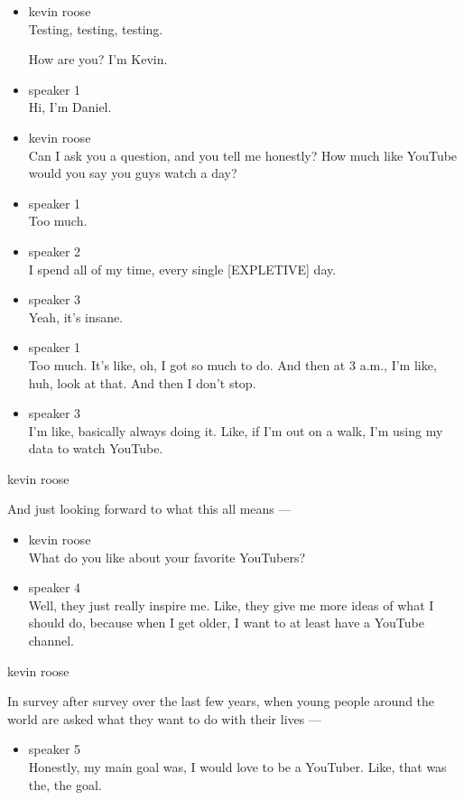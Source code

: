 \begin{itemize}
\item
  kevin roose\\
  Testing, testing, testing.

  How are you? I'm Kevin.
\item
  speaker 1\\
  Hi, I'm Daniel.
\item
  kevin roose\\
  Can I ask you a question, and you tell me honestly? How much like
  YouTube would you say you guys watch a day?
\item
  speaker 1\\
  Too much.
\item
  speaker 2\\
  I spend all of my time, every single {[}EXPLETIVE{]} day.
\item
  speaker 3\\
  Yeah, it's insane.
\item
  speaker 1\\
  Too much. It's like, oh, I got so much to do. And then at 3 a.m., I'm
  like, huh, look at that. And then I don't stop.
\item
  speaker 3\\
  I'm like, basically always doing it. Like, if I'm out on a walk, I'm
  using my data to watch YouTube.
\end{itemize}

kevin roose

And just looking forward to what this all means ---

\begin{itemize}
\item
  kevin roose\\
  What do you like about your favorite YouTubers?
\item
  speaker 4\\
  Well, they just really inspire me. Like, they give me more ideas of
  what I should do, because when I get older, I want to at least have a
  YouTube channel.
\end{itemize}

kevin roose

In survey after survey over the last few years, when young people around
the world are asked what they want to do with their lives ---

\begin{itemize}
\tightlist
\item
  speaker 5\\
  Honestly, my main goal was, I would love to be a YouTuber. Like, that
  was the, the goal.
\end{itemize}

